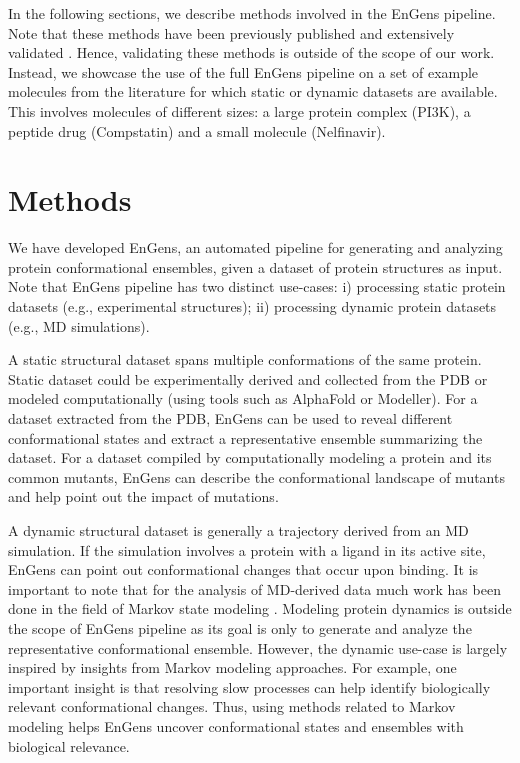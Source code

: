 \documentclass[unnumsec,webpdf,contemporary,large,numsquare]{oup-authoring-template}%
\theoremstyle{thmstyleone}%
\theoremstyle{thmstyletwo}%
\theoremstyle{thmstylethree}%
\begin{document}
In the following sections, we describe methods involved in the EnGens pipeline. Note that these methods have been previously published and extensively validated \citep{scherer_pyemma_2015, chen_nonlinear_2019, trozzi_umap_2021, perez-hernandez_identification_2013, schwantes_modeling_2015}. Hence, validating these methods is outside of the scope of our work. Instead, we showcase the use of the full EnGens pipeline on a set of example molecules from the literature for which static or dynamic datasets are available. This involves molecules of different sizes: a large protein complex (PI3K), a peptide drug (Compstatin) and a small molecule (Nelfinavir). 

\section{Methods}\label{sec2}

We have developed EnGens, an automated pipeline for generating and analyzing protein conformational ensembles, given a dataset of protein structures as input. Note that EnGens pipeline has two distinct use-cases: i) processing static protein datasets (e.g., experimental structures); ii) processing  dynamic protein datasets (e.g., MD simulations). 

A static structural dataset spans multiple conformations of the same protein. Static dataset could be experimentally derived and collected from the PDB or modeled computationally (using tools such as AlphaFold or Modeller). For a dataset extracted from the PDB, EnGens can be used to reveal different conformational states and extract a representative ensemble summarizing the dataset. For a dataset compiled by computationally modeling a protein and its common mutants, EnGens can describe the conformational landscape of mutants and help point out the impact of mutations.

A dynamic structural dataset is generally a trajectory derived from an MD simulation. If the simulation involves a protein with a ligand in its active site, EnGens can point out conformational changes that occur upon binding. It is important to note that for the analysis of MD-derived data much work has been done in the field of Markov state modeling \citep{abella_markov_2020, husic_markov_2018, bernetti_integrated_2019}. Modeling protein dynamics is outside the scope of EnGens pipeline as its goal is only to generate and analyze the representative conformational ensemble. However, the dynamic use-case is largely inspired by insights from Markov modeling approaches. For example, one important insight is that resolving slow processes can help identify biologically relevant conformational changes. Thus, using methods related to Markov modeling helps EnGens uncover conformational states and ensembles with biological relevance. 
\end{document}
